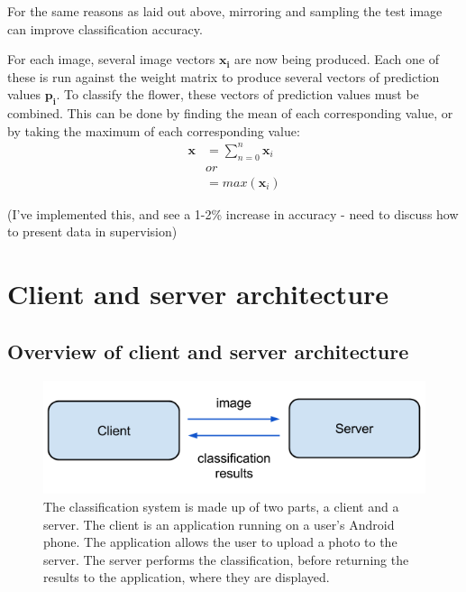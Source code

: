 \documentclass[11pt, a4paper]{report}
\newcommand{\vect}[1]{\boldsymbol{#1}}
\begin{document}
For the same reasons as laid out above, mirroring and sampling the test image can improve classification accuracy.

For each image, several image vectors $\vect{x_{i}}$ are now being produced. Each one of these is run against the weight matrix to produce several vectors of prediction values $\vect{p_{i}}$. To classify the flower, these vectors of prediction values must be combined. This can be done by finding the mean of each corresponding value, or by taking the maximum of each corresponding value:
$$
\begin{aligned}
	\vect{x} &= \sum_{n = 0}^{n} \vect{x}_{i} \\
	& or \\
	&= max(\vect{x}_i)
\end{aligned}
$$

(I've implemented this, and see a 1-2\% increase in accuracy - need to discuss how to present data in supervision)





\chapter{Client and server architecture}

\section{Overview of client and server architecture}

\begin{figure}[h]
	\centering
  \includegraphics[totalheight=3cm]{img/11.png}
  \caption{The classification system is made up of two parts, a client and a server. The client is an application running on a user's Android phone. The application allows the user to upload a photo to the server. The server performs the classification, before returning the results to the application, where they are displayed.}
  \label{img:11}
\end{figure}
\end{document}
